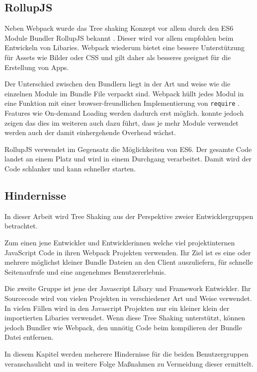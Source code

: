 \subsection{RollupJS}
Neben Webpack wurde das Tree shaking Konzept vor allem durch den ES6 Module Bundler RollupJS bekannt \autocite{WebpackTreeShaking}. Dieser wird vor allem empfohlen beim Entwickeln von Libaries. Webpack wiederum bietet eine bessere Unterstützung für Assets wie Bilder oder CSS und gilt daher als besseres geeignet für die Erstellung von Apps. \autocite{RichHarris}

Der Unterschied zwischen den Bundlern liegt in der Art und weise wie die einzelnen Module im Bundle File verpackt sind. Webpack hüllt jedes Modul in eine Funktion mit einer browser-freundlichen Implementierung von \lstinline{require} \autocite{RichHarris}. Features wie On-demand Loading werden dadurch erst möglich. \textcite{NolanLawson} konnte jedoch zeigen das dies im weiteren auch dazu führt, dass je mehr Module verwendet werden auch der damit einhergehende Overhead wächst.

RollupJS verwendet im Gegensatz die Möglichkeiten von ES6. Der gesamte Code landet an einem Platz und wird in einem Durchgang verarbeitet. Damit wird der Code schlanker und kann schneller starten. \autocite{RichHarris}

\subsection{Hindernisse}
\label{section:schwierigkeiten_beim_tree_shaking}
In dieser Arbeit wird Tree Shaking aus der Perspektive zweier Entwicklergruppen betrachtet. 

Zum einen jene Entwickler und Entwicklerinnen welche viel projektinternen JavaScript Code in ihren Webpack Projekten verwenden. Ihr Ziel ist es eine oder mehrere möglichst kleiner Bundle Dateien an den Client auszuliefern, für schnelle Seitenaufrufe und eine angenehmes Benutzererlebnis.

Die zweite Gruppe ist jene der Javascript Libary und Framework Entwickler. Ihr Sourcecode wird von vielen Projekten in verschiedener Art und Weise verwendet. In vielen Fällen wird in den Javascript Projekten nur ein kleiner klein der importierten Libaries verwendet. Wenn diese Tree Shaking unterstützt, können jedoch Bundler wie Webpack, den unnötig Code beim kompilieren der Bundle Datei entfernen.

In diesem Kapitel werden meherere Hindernisse für die beiden Benutzergruppen veranschaulicht und in weitere Folge Maßnahmen zu Vermeidung dieser ermittelt. 


